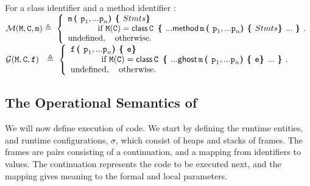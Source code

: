  \begin{definition}[Lookup] For a class identifier   and a method identifier $:$  $ ~ $ \\

\noindent
$
\Meths {} {\prg{C}} {m}       \triangleq  \ \left\{
\begin{array}{l}
                        \m\, \lp \p_1, ... \p_n \rp \lb Stmts   \rb\\
\hspace{0.5in} \mbox{if}\  \M(\prg{C}) =   \kwN{class}\, \prg{C}\, \  \lb ...   \kwN{method}\, \m\, \lp \p_1, ... \p_n \rp \lb Stmts  \rb  ... \ \rb.
\\
\mbox{undefined},  \ \ \ \mbox{otherwise.}
\end{array}
                    \right.$
\\
$
{\mathcal G} (\M, {\prg{C}}, {\f})    \ \   \triangleq  \ \left\{
\begin{array}{l}
                        \f\, \lp \p_1, ... \p_n \rp \lb \prg{e}  \rb\\
\hspace{0.5in} \mbox{if}\  \M(\prg{C}) =   \kwN{class}\, \prg{C}\, \  \lb ...   \kwN{ghost}\,  \m\, \lp \p_1, ... \p_n \rp \lb \prg{e}  \rb  ... \ \rb.
\\
\mbox{undefined},  \ \ \ \mbox{otherwise.}
\end{array}
                    \right.$
  \end{definition}

\subsection{The Operational Semantics of \LangOO}
\label{formal:semantics}

We will now define execution of \LangOO code.
We start by  defining the  runtime entities, and runtime configurations, $\sigma$, which consist of heaps and stacks of frames.
 The frames are pairs consisting of a continuation, and a mapping from identifiers to values.
The continuation represents the code to be executed next, and the mapping gives meaning
to the formal and local parameters.

